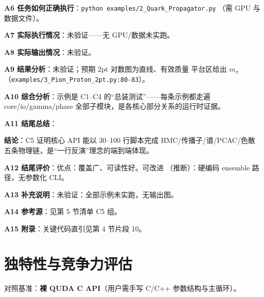 \documentclass[UTF8]{ctexart}
\begin{document}
\textbf{A6 任务如何正确执行}：\texttt{python examples/2\_Quark\_Propagator.py}
（需 GPU 与数据文件）。

\textbf{A7 实际执行情况}：\textcolor{warn}{未验证}——无 GPU/数据未实跑。

\textbf{A8 实际输出情况}：\textcolor{warn}{未验证}。

\textbf{A9 结果分析}：\textcolor{warn}{未验证}；预期 2pt 对数图为直线、有效质量
平台区给出 $m_\pi$（\texttt{\nolinkurl{examples/3_Pion_Proton_2pt.py:80-83}}）。

\textbf{A10 综合分析}：示例是 C1–C4 的“总装测试”——每条示例都走遍
core/io/gamma/phase 全部子模块，是各核心部分关系的运行时证据。

\textbf{A11 结尾总结}：
\begin{conclbox}
\textbf{结论}：C5 证明核心 API 能以 30–100 行脚本完成 HMC/传播子/谱/PCAC/色散
五条物理链，是“一行反演”理念的端到端体现。
\end{conclbox}

\textbf{A12 结尾评价}：优点：覆盖广、可读性好。可改进
（\textcolor{phys}{推断}）：硬编码 ensemble 路径，无参数化 CLI。

\textbf{A13 补充说明}：\textcolor{warn}{未验证}：全部示例未实跑，无输出图。

\textbf{A14 参考源}：见第 5 节清单 C5 组。

\textbf{A15 附录}：关键代码直引见第 4 节片段 10。

\section{独特性与竞争力评估}
对照基准：\textbf{裸 QUDA C API}（用户需手写 C/C++ 参数结构与主循环）。
\end{document}
